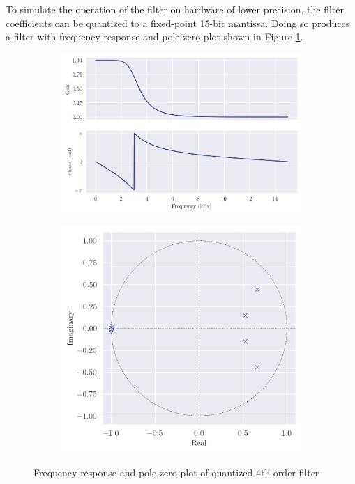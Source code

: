 To simulate the operation of the filter on hardware of lower precision, the filter coefficients can be quantized to a fixed-point 15-bit mantissa. Doing so produces a filter with frequency response and pole-zero plot shown in Figure \ref{fig:q7_q4th_freqz_zp}.

\begin{figure}[ht]
    \centering
    \begin{subfigure}[b]{0.58\textwidth}
        \centering
        \includegraphics[width=\textwidth]{images/q7_q4th_freqz.png}
    \end{subfigure}
    \hfill
    \begin{subfigure}[b]{0.41\textwidth}
        \centering
        \includegraphics[width=\textwidth]{images/q7_q4th_zp.png}
    \end{subfigure}
    \caption{Frequency response and pole-zero plot of quantized 4th-order filter}
    \label{fig:q7_q4th_freqz_zp}
\end{figure}

